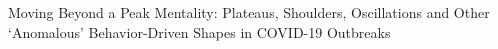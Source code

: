 Moving Beyond a Peak Mentality: Plateaus, Shoulders, Oscillations and Other `Anomalous' Behavior-Driven Shapes in COVID-19 Outbreaks

